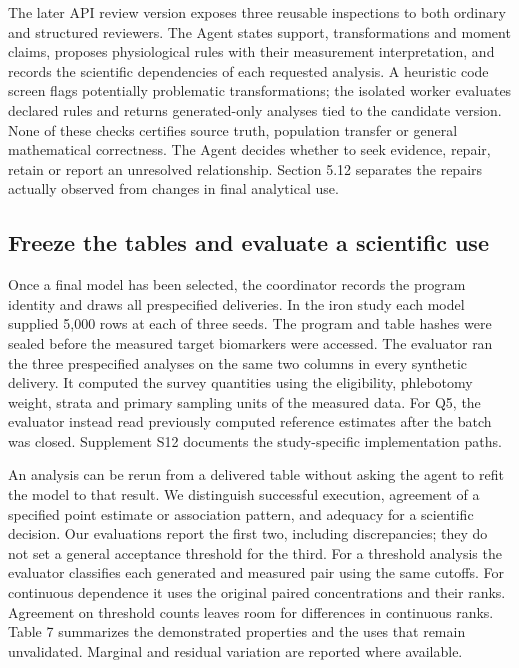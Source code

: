 \documentclass[11pt,letterpaper]{article}
\begin{document}
The later API review version exposes three reusable inspections to both ordinary and structured reviewers. The Agent states support, transformations and moment claims, proposes physiological rules with their measurement interpretation, and records the scientific dependencies of each requested analysis. A heuristic code screen flags potentially problematic transformations; the isolated worker evaluates declared rules and returns generated-only analyses tied to the candidate version. None of these checks certifies source truth, population transfer or general mathematical correctness. The Agent decides whether to seek evidence, repair, retain or report an unresolved relationship. Section 5.12 separates the repairs actually observed from changes in final analytical use.


\subsection{Freeze the tables and evaluate a scientific use}

Once a final model has been selected, the coordinator records the program identity and draws all prespecified deliveries. In the iron study each model supplied 5,000 rows at each of three seeds. The program and table hashes were sealed before the measured target biomarkers were accessed. The evaluator ran the three prespecified analyses on the same two columns in every synthetic delivery. It computed the survey quantities using the eligibility, phlebotomy weight, strata and primary sampling units of the measured data. For Q5, the evaluator instead read previously computed reference estimates after the batch was closed. Supplement S12 documents the study-specific implementation paths.


An analysis can be rerun from a delivered table without asking the agent to refit the model to that result. We distinguish successful execution, agreement of a specified point estimate or association pattern, and adequacy for a scientific decision. Our evaluations report the first two, including discrepancies; they do not set a general acceptance threshold for the third. For a threshold analysis the evaluator classifies each generated and measured pair using the same cutoffs. For continuous dependence it uses the original paired concentrations and their ranks. Agreement on threshold counts leaves room for differences in continuous ranks. Table 7 summarizes the demonstrated properties and the uses that remain unvalidated. Marginal and residual variation are reported where available.
\end{document}

